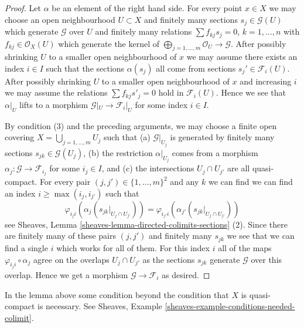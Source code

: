 \begin{proof}
Let $\alpha$ be an element of the right hand side.
For every point $x \in X$ we may choose an open neighbourhood
$U \subset X$ and finitely many sections
$s_j \in \mathcal{G}(U)$ which generate $\mathcal{G}$ over $U$
and finitely many relations $\sum f_{kj} s_j = 0$, $k = 1, \ldots, n$
with $f_{kj} \in \mathcal{O}_X(U)$ which generate the kernel
of $\bigoplus_{j = 1, \ldots, m} \mathcal{O}_U \to \mathcal{G}$.
After possibly shrinking $U$ to a smaller open neighbourhood of $x$
we may assume there exists an index $i \in I$ such that
the sections $\alpha(s_j)$ all come from sections
$s_j' \in \mathcal{F}_i(U)$.
After possibly shrinking $U$ to a smaller open neighbourhood of $x$
and increasing $i$ we may assume the relations
$\sum f_{kj} s'_j = 0$ hold in $\mathcal{F}_i(U)$.
Hence we see that $\alpha|_U$ lifts to a morphism
$\mathcal{G}|_U \to \mathcal{F}_i|_U$ for some index $i \in I$.

\medskip\noindent
By condition (3) and the preceding arguments, we may choose
a finite open covering $X = \bigcup_{j = 1, \ldots, m} U_j$
such that (a) $\mathcal{G}|_{U_j}$ is generated by finitely
many sections $s_{jk} \in \mathcal{G}(U_j)$, (b) the restriction
$\alpha|_{U_j}$ comes from a morphism
$\alpha_j : \mathcal{G} \to \mathcal{F}_{i_j}$
for some $i_j \in I$, and (c) the intersections
$U_j \cap U_{j'}$ are all quasi-compact.
For every pair $(j, j') \in \{1, \ldots, m\}^2$
and any $k$ we can find
we can find an index $i \geq \max(i_j, i_{j'})$ such
that
$$
\varphi_{i_ji}(\alpha_j(s_{jk}|_{U_j \cap U_{j'}})) =
\varphi_{i_{j'}i}(\alpha_{j'}(s_{jk}|_{U_j \cap U_{j'}}))
$$
see Sheaves, Lemma \ref{sheaves-lemma-directed-colimits-sections} (2).
Since there are finitely many of these pairs $(j, j')$ and
finitely many $s_{jk}$ we see that we can find a single $i$
which works for all of them. For this index $i$ all of the maps
$\varphi_{i_ji} \circ \alpha_j$ agree on the overlaps $U_j \cap U_{j'}$
as the sections $s_{jk}$ generate $\mathcal{G}$ over this overlap.
Hence we get a morphism $\mathcal{G} \to \mathcal{F}_i$ as desired.
\end{proof}

\begin{remark}
\label{remark-condition-necessary}
In the lemma above some condition beyond the condition that $X$
is quasi-compact is necessary. See
Sheaves, Example \ref{sheaves-example-conditions-needed-colimit}.
\end{remark}







